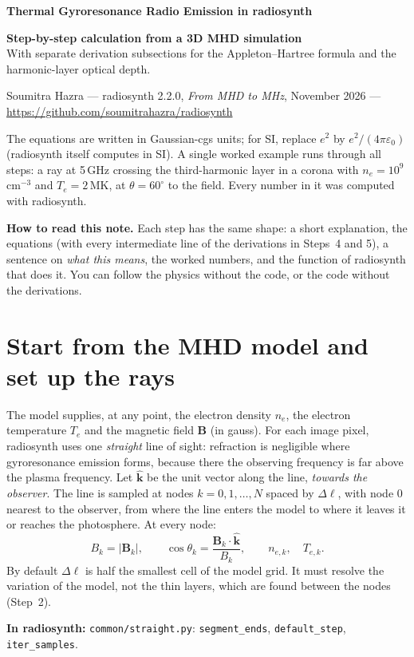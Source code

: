 \documentclass[11pt,a4paper]{article}
\newcommand{\vect}[1]{\bm{#1}}
\newcommand{\code}[1]{\texttt{#1}}
\newcommand{\incode}[1]{\par{\small\color{head!80!black}\textbf{In radiosynth:} #1}\par}
\begin{document}
\setcounter{section}{-1}
\begin{center}
{\LARGE\bfseries\color{head} Thermal Gyroresonance Radio Emission in radiosynth\par}
\end{center}
\vspace{2pt}
\textbf{Step-by-step calculation from a 3D MHD simulation}\\
With separate derivation subsections for the Appleton--Hartree formula and the harmonic-layer
optical depth.

Soumitra Hazra --- \textsf{radiosynth} 2.2.0, \emph{From MHD to MHz}, November 2026 ---
\url{https://github.com/soumitrahazra/radiosynth}

The equations are written in Gaussian-cgs units; for SI, replace $e^2$ by $e^2/(4\pi\varepsilon_0)$
(radiosynth itself computes in SI). A single worked example runs through all steps: a ray at
5\,GHz crossing the third-harmonic layer in a corona with $n_e=10^9$\,cm$^{-3}$ and
$T_e=2$\,MK, at $\theta=60^\circ$ to the field. Every number in it was computed with radiosynth.

\textbf{How to read this note.} Each step has the same shape: a short explanation, the equations
(with every intermediate line of the derivations in Steps~4 and 5), a sentence on \emph{what this means},
the worked numbers, and the function of radiosynth that does it. You can follow the physics
without the code, or the code without the derivations.

\section{Start from the MHD model and set up the rays}
The model supplies, at any point, the electron density $n_e$, the electron temperature $T_e$ and
the magnetic field $\vect B$ (in gauss). For each image pixel, radiosynth uses one
\emph{straight} line of sight: refraction is negligible where gyroresonance emission forms,
because there the observing frequency is far above the plasma frequency. Let $\hat{\vect k}$ be
the unit vector along the line, \emph{towards the observer}. The line is sampled at nodes
$k=0,1,\ldots,N$ spaced by $\Delta\ell$, with node 0 nearest to the observer, from where the line
enters the model to where it leaves it or reaches the photosphere. At every node:
\[
  B_k=|\vect B_k|,\qquad \cos\theta_k=\frac{\vect B_k\cdot\hat{\vect k}}{B_k},\qquad
  n_{e,k},\quad T_{e,k}.
\]
By default $\Delta\ell$ is half the smallest cell of the model grid. It must resolve the variation
of the model, not the thin layers, which are found between the nodes (Step~2).
\incode{\code{common/straight.py}: \code{segment\_ends}, \code{default\_step}, \code{iter\_samples}.}
\end{document}
